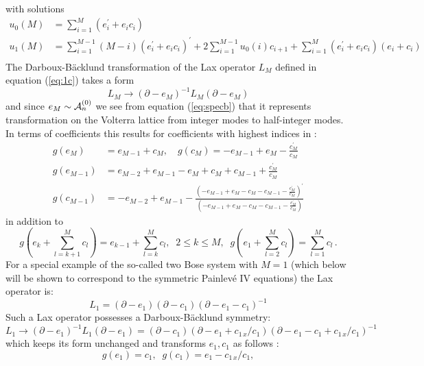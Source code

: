 \documentclass[12pt]{article}
\numberwithin{equation}{section}
\def\rf#1{(\ref{eq:#1})}
\def\lab#1{\label{eq:#1}}
\begin{document}
with solutions
\[
\begin{split}
u_0 (M) &= \sum_{i=1}^{M}
\left(e^{\prime}_{i} + e_{i} c_{i} \right) \\
u_1 (M) 
&= \sum_{i=1}^{M-1} (M-i) \left(e^{\prime}_{i} + e_{i} c_{i} \right)^{\prime} + 
2 \sum_{i=1}^{M-1} u_0  (i) c_{i+1} +\sum_{i=1}^{M}
\left(e^{\prime}_{i} + e_{i} c_{i} \right) \left( e_{i}+ c_{i} \right) \\
\end{split}
\]
The Darboux-B\"acklund transformation of the Lax operator $L_M$ 
defined in equation \rf{1c} takes a form
\[
L_M \to  \left( \partial - e_{M} \right)^{-1} L_M \left( \partial - e_{M} \right)
\lab{simM}
\]
and since  $e_M \sim {\cal A}^{(0)}_n $ we see from equation \rf{specb}
that it represents transformation on the Volterra lattice from
integer modes to half-integer modes.
In terms of coefficients this results
for coefficients with highest indices  in :
\begin{equation}
\begin{split}
g( e_M)&=e_{M-1} + c_M, \quad g( c_M)=-e_{M-1} + e_M-\frac{c_M^{\prime}}{c_M}\\
g( e_{M-1})&=e_{M-2}+e_{M-1}-e_M +c_M+c_{M-1} + \frac{c_M^{\prime}}{c_M} \\
g( c_{M-1})&=-e_{M-2} + e_{M-1} -\frac{\left(   -e_{M-1} + e_M-c_M-c_{M-1} -\frac{c_M^{\prime}}{c_M} \right)^{\prime}}{\left(-e_{M-1} + e_M-c_M-c_{M-1} -\frac{c_M^{\prime}}{c_M}\right)}
\end{split}
\lab{gemcm}
\end{equation}
in addition to
\begin{equation}
g \left( e_k+\sum_{l=k+1}^M c_l \right)=e_{k-1}+\sum_{l=k}^M c_l, \;\; 2 \le k \le M,\;\;
g \left( e_1+\sum_{l=2}^M c_l \right)=\sum_{l=1}^M c_l\, .
\lab{gaddition}
\end{equation}
For a special example of the so-called two Bose system 
with $M=1$ (which below will
be shown to correspond to the symmetric Painlev\'e IV
equations)
the Lax operator is:
\[
L_1 = (\partial-e_1)(\partial-c_1)(\partial-e_1-c_1)^{-1}
\]
Such a  Lax operator possesses a Darboux-B\"acklund symmetry:
\[
L_1 \to (\partial-e_1)^{-1} L_1 (\partial-e_1)= (\partial-c_1)(\partial-e_1+c_{1\,x}/c_1)(\partial-e_1-c_1+c_{1\,x}/c_1)^{-1}
\]
which keeps its form  unchanged and transforms $e_1,c_1$ as 
follows :
\begin{equation}
g \left(e_1 \right) = c_1 , \;\; g  \left(c_1 \right)=e_1- c_{1\,x}/c_1, 
\lab{g2bose}
\end{equation}
\end{document}
